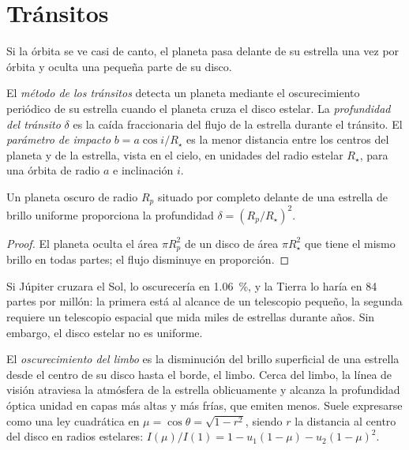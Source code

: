\section{Tránsitos}\label{sec:b3:exoplanets:transits}

Si la órbita se ve casi de canto, el planeta pasa delante de su
estrella una vez por órbita y oculta una pequeña parte de su disco.

\begin{definition}\label{def:b3:exoplanets:transit}
El \emph{método de los tránsitos} detecta un planeta mediante el
oscurecimiento periódico de su estrella cuando el planeta cruza el disco estelar. La
\emph{profundidad del tránsito} $\delta$ es la caída fraccionaria
del flujo de la estrella durante el tránsito. El \emph{parámetro de
impacto} $b = a\cos i/R_\star$ es la
menor distancia entre los centros del planeta y de la estrella, vista en el cielo,
en unidades del radio estelar $R_\star$, para una órbita de
radio $a$ e inclinación $i$.
\end{definition}

\begin{proposition}\label{prop:b3:exoplanets:depth}
Un planeta oscuro de radio $R_p$ situado por completo delante de una estrella de brillo
uniforme proporciona la profundidad $\delta = (R_p/R_\star)^2$.
\end{proposition}

\begin{proof}
El planeta oculta el área $\pi R_p^2$ de un disco de área $\pi R_\star^2$
que tiene el mismo brillo en todas partes; el flujo disminuye en proporción.
\end{proof}

Si Júpiter cruzara el Sol, lo oscurecería en \qty{1.06}{\percent}, y la Tierra
lo haría en \num{84} partes por millón: la primera está al alcance de un
telescopio pequeño, la segunda requiere un telescopio espacial que mida miles de
estrellas durante años. Sin embargo, el disco estelar no es uniforme.

\begin{definition}\label{def:b3:exoplanets:limb}
El \emph{oscurecimiento del limbo} es la disminución del brillo superficial
de una estrella desde el centro de su disco hasta el borde, el limbo.
Cerca del limbo, la línea de visión atraviesa la atmósfera de la estrella oblicuamente
y alcanza la profundidad óptica unidad en capas más altas y más frías, que emiten
menos. Suele expresarse como una ley cuadrática en $\mu = \cos\theta =
\sqrt{1 - r^2}$, siendo $r$ la distancia al centro del disco en
radios estelares: $I(\mu)/I(1) = 1 - u_1(1 - \mu) - u_2(1 - \mu)^2$.
\end{definition}

